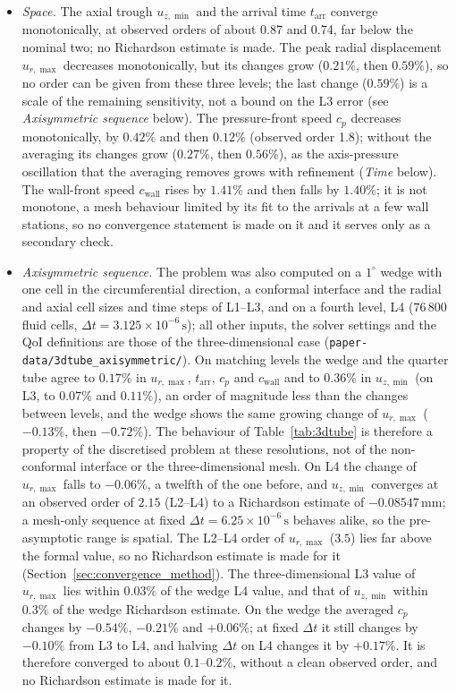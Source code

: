 \begin{itemize}
	\item \emph{Space.} The axial trough $u_{z,\min}$ and the arrival time $t_\mathrm{arr}$ converge monotonically, at observed orders of about 0.87 and 0.74, far below the nominal two; no Richardson estimate is made. The peak radial displacement $u_{r,\max}$ decreases monotonically, but its changes grow ($0.21\%$, then $0.59\%$), so no order can be given from these three levels; the last change ($0.59\%$) is a scale of the remaining sensitivity, not a bound on the L3 error (see \emph{Axisymmetric sequence} below). The pressure-front speed $c_p$ decreases monotonically, by $0.42\%$ and then $0.12\%$ (observed order 1.8); without the averaging its changes grow ($0.27\%$, then $0.56\%$), as the axis-pressure oscillation that the averaging removes grows with refinement (\emph{Time} below). The wall-front speed $c_\mathrm{wall}$ rises by $1.41\%$ and then falls by $1.40\%$; it is not monotone, a mesh behaviour limited by its fit to the arrivals at a few wall stations, so no convergence statement is made on it and it serves only as a secondary check.
	\item \emph{Axisymmetric sequence.} The problem was also computed on a $1^\circ$ wedge with one cell in the circumferential direction, a conformal interface and the radial and axial cell sizes and time steps of L1--L3, and on a fourth level, L4 ($76\,800$ fluid cells, $\Delta t = 3.125\times10^{-6}\,\mathrm{s}$); all other inputs, the solver settings and the QoI definitions are those of the three-dimensional case (\texttt{paper-data/3dtube\_axisymmetric/}). On matching levels the wedge and the quarter tube agree to $0.17\%$ in $u_{r,\max}$, $t_\mathrm{arr}$, $c_p$ and $c_\mathrm{wall}$ and to $0.36\%$ in $u_{z,\min}$ (on L3, to $0.07\%$ and $0.11\%$), an order of magnitude less than the changes between levels, and the wedge shows the same growing change of $u_{r,\max}$ ($-0.13\%$, then $-0.72\%$). The behaviour of Table~\ref{tab:3dtube} is therefore a property of the discretised problem at these resolutions, not of the non-conformal interface or the three-dimensional mesh. On L4 the change of $u_{r,\max}$ falls to $-0.06\%$, a twelfth of the one before, and $u_{z,\min}$ converges at an observed order of $2.15$ (L2--L4) to a Richardson estimate of $-0.08547\,\mathrm{mm}$; a mesh-only sequence at fixed $\Delta t = 6.25\times10^{-6}\,\mathrm{s}$ behaves alike, so the pre-asymptotic range is spatial. The L2--L4 order of $u_{r,\max}$ ($3.5$) lies far above the formal value, so no Richardson estimate is made for it (Section~\ref{sec:convergence_method}). The three-dimensional L3 value of $u_{r,\max}$ lies within $0.03\%$ of the wedge L4 value, and that of $u_{z,\min}$ within $0.3\%$ of the wedge Richardson estimate. On the wedge the averaged $c_p$ changes by $-0.54\%$, $-0.21\%$ and $+0.06\%$; at fixed $\Delta t$ it still changes by $-0.10\%$ from L3 to L4, and halving $\Delta t$ on L4 changes it by $+0.17\%$. It is therefore converged to about $0.1$--$0.2\%$, without a clean observed order, and no Richardson estimate is made for it.

\end{itemize}
